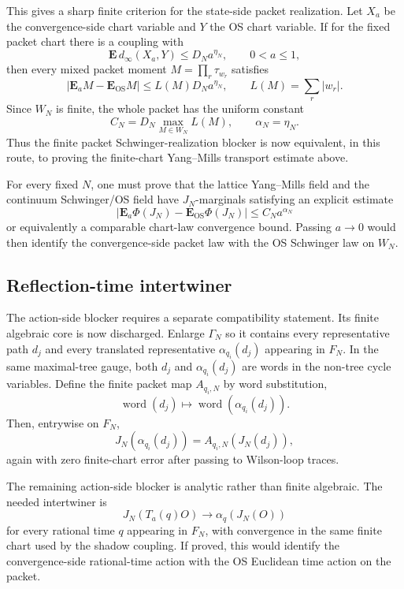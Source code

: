 This gives a sharp finite criterion for the state-side packet realization. Let
$X_a$ be the convergence-side chart variable and $Y$ the OS chart variable. If
for the fixed packet chart there is a coupling with
\[
  \mathbf E\,d_\infty(X_a,Y)\leq D_Na^{\eta_N},\qquad 0<a\leq1,
\]
then every mixed packet moment $M=\prod_r\tau_{w_r}$ satisfies
\[
  \left|\mathbf E_aM-\mathbf E_{\mathrm{OS}}M\right|
  \leq
  L(M)D_Na^{\eta_N},
  \qquad L(M)=\sum_r |w_r|.
\]
Since $W_N$ is finite, the whole packet has the uniform constant
\[
  C_N=D_N\max_{M\in W_N}L(M),\qquad \alpha_N=\eta_N.
\]
Thus the finite packet Schwinger-realization blocker is now equivalent, in this
route, to proving the finite-chart Yang--Mills transport estimate above.

For every fixed $N$, one must prove that the lattice Yang--Mills field and the
continuum Schwinger/OS field have $J_N$-marginals satisfying an explicit estimate
\[
  \left|\mathbf E_a\Phi(J_N)-\mathbf E_{\mathrm{OS}}\Phi(J_N)\right|
  \leq C_N a^{\alpha_N}
\]
or equivalently a comparable chart-law convergence bound. Passing $a\to0$ would
then identify the convergence-side packet law with the OS Schwinger law on
$W_N$.

\subsection{Reflection-time intertwiner}
The action-side blocker requires a separate compatibility statement. Its finite algebraic core is now discharged. Enlarge $\Gamma_N$ so it contains every
representative path $d_j$ and every translated representative
$\alpha_{q_i}(d_j)$ appearing in $F_N$. In the same maximal-tree gauge, both
$d_j$ and $\alpha_{q_i}(d_j)$ are words in the non-tree cycle variables. Define
the finite packet map $A_{q_i,N}$ by word substitution,
\[
  \operatorname{word}(d_j)\mapsto \operatorname{word}(\alpha_{q_i}(d_j)).
\]
Then, entrywise on $F_N$,
\[
  J_N(\alpha_{q_i}(d_j))=A_{q_i,N}(J_N(d_j)),
\]
again with zero finite-chart error after passing to Wilson-loop traces.

The remaining action-side blocker is analytic rather than finite algebraic. The needed
intertwiner is
\[
  J_N(T_a(q)O)\longrightarrow \alpha_q(J_N(O))
\]
for every rational time $q$ appearing in $F_N$, with convergence in the same
finite chart used by the shadow coupling. If proved, this would identify the
convergence-side rational-time action with the OS Euclidean time action on the
packet.

